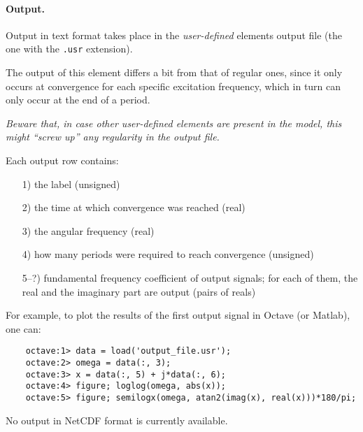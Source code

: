 \paragraph{Output.}
Output in text format takes place in the \emph{user-defined} elements output file (the one with the \texttt{.usr} extension).

The output of this element differs a bit from that of regular ones, since it only occurs at convergence for each specific excitation frequency, which in turn can only occur at the end of a period.

\bigskip

\begin{framed}
\noindent
\emph{Beware that, in case other user-defined elements are present in the model, this might ``screw up'' any regularity in the output file.}
\end{framed}

\bigskip

Each output row contains:
\begin{itemize}
\item[1)] the label (unsigned)
\item[2)] the time at which convergence was reached (real)
\item[3)] the angular frequency (real)
\item[4)] how many periods were required to reach convergence (unsigned)
\item[5--?)] fundamental frequency coefficient of output signals; for each of them, the real and the imaginary part are output (pairs of reals)
\end{itemize}
For example, to plot the results of the first output signal in Octave (or Matlab), one can:
\begin{verbatim}
    octave:1> data = load('output_file.usr');
    octave:2> omega = data(:, 3);
    octave:3> x = data(:, 5) + j*data(:, 6);
    octave:4> figure; loglog(omega, abs(x));
    octave:5> figure; semilogx(omega, atan2(imag(x), real(x)))*180/pi;
\end{verbatim}


No output in NetCDF format is currently available.

